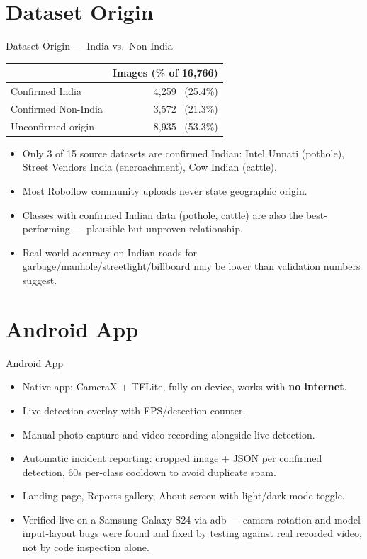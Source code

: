 \documentclass[10pt]{beamer}
\begin{document}
\section{Dataset Origin}
\begin{frame}{Dataset Origin — India vs.\ Non-India}
  \begin{table}
    \centering\small
    \begin{tabular}{lr}
      \toprule
       & Images (\% of 16{,}766) \\
      \midrule
      Confirmed India       & 4{,}259 \ (25.4\%) \\
      Confirmed Non-India   & 3{,}572 \ (21.3\%) \\
      Unconfirmed origin    & 8{,}935 \ (53.3\%) \\
      \bottomrule
    \end{tabular}
  \end{table}
  \begin{itemize}
    \item Only 3 of 15 source datasets are confirmed Indian: Intel Unnati (pothole),
      Street Vendors India (encroachment), Cow Indian (cattle).
    \item Most Roboflow community uploads never state geographic origin.
    \item Classes with confirmed Indian data (pothole, cattle) are also the
      best-performing — plausible but unproven relationship.
    \item Real-world accuracy on Indian roads for garbage/manhole/streetlight/billboard
      may be lower than validation numbers suggest.
  \end{itemize}
\end{frame}

\section{Android App}
\begin{frame}{Android App}
  \begin{itemize}
    \item Native app: CameraX + TFLite, fully on-device, works with \textbf{no internet}.
    \item Live detection overlay with FPS/detection counter.
    \item Manual photo capture and video recording alongside live detection.
    \item Automatic incident reporting: cropped image + JSON per confirmed detection,
      60s per-class cooldown to avoid duplicate spam.
    \item Landing page, Reports gallery, About screen with light/dark mode toggle.
    \item Verified live on a Samsung Galaxy S24 via adb — camera rotation and
      model input-layout bugs were found and fixed by testing against real
      recorded video, not by code inspection alone.
  \end{itemize}
\end{frame}
\end{document}
